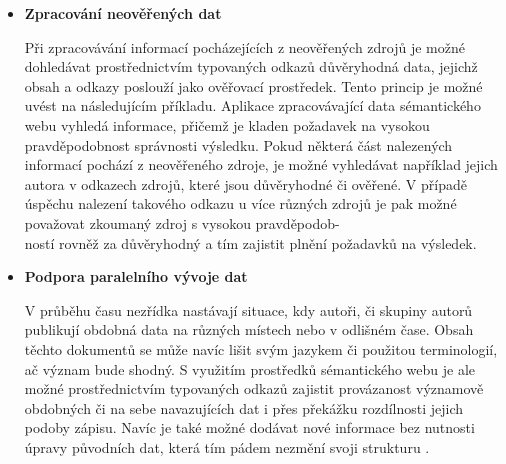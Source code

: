 \documentclass{projekt}
\begin{document}
\begin {itemize}
\item \textbf{Zpracování neověřených dat}

\hspace{0.65cm}Při zpracovávání informací pocházejících z neověřených zdrojů je možné dohledávat prostřednictvím typovaných odkazů důvěryhodná data, jejichž obsah a odkazy poslouží jako ověřovací prostředek. Tento princip je možné uvést na následujícím příkladu. Aplikace zpracovávající data sémantického webu vyhledá informace, přičemž je kladen požadavek na vysokou pravděpodobnost správnosti výsledku. Pokud některá část nalezených informací pochází z neověřeného zdroje, je možné vyhledávat například jejich autora v odkazech zdrojů, které jsou důvěryhodné či ověřené. V případě úspěchu nalezení takového odkazu u více různých zdrojů je pak možné považovat zkoumaný zdroj s vysokou pravděpodob-\\ností rovněž za důvěryhodný a tím zajistit plnění požadavků na výsledek.

\item \textbf{Podpora paralelního vývoje dat}

\hspace{0.65cm}V průběhu času nezřídka nastávají situace, kdy autoři, či skupiny autorů publikují obdobná data na různých místech nebo v odlišném čase. Obsah těchto dokumentů se může navíc lišit svým jazykem či použitou terminologií, ač význam bude shodný. S využitím prostředků sémantického webu je ale možné prostřednictvím typovaných odkazů zajistit provázanost významově obdobných či na sebe navazujících dat i přes překážku rozdílnosti jejich podoby zápisu. Navíc je také možné dodávat nové informace bez nutnosti úpravy původních dat, která tím pádem nezmění svoji strukturu \cite{_1}.

\end{itemize}
\end{document}

